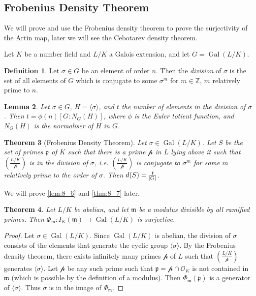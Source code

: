 \documentclass[11pt]{article}
\theoremstyle{definition}
\newtheorem{definition}{Definition}[section]
\theoremstyle{plain}
\newtheorem{theorem}[definition]{Theorem}
\newtheorem{lemma}[definition]{Lemma}
\theoremstyle{remark}
\DeclareMathOperator{\Gal}{Gal}
\newcommand{\ZZ}{\mathbb{Z}}
\newcommand{\cO}{\mathcal{O}}
\newcommand{\cp}{\mathcal{p}}
\newcommand{\fp}{\mathfrak{p}}
\newcommand{\fm}{\mathfrak{m}}
\newcommand{\leg}[2]{\left(\frac{#1}{#2}\right)}
\begin{document}
\subsection{Frobenius Density Theorem}

We will prove and use the Frobenius density theorem to prove the surjectivity of the Artin map, later we will see the Cebotarev density theorem.

Let $K$ be a number field and $L/K$ a Galois extension, and let $G = \Gal(L/K)$.

\begin{definition}\label{def:8_5}
    Let $\sigma \in G$ be an element of order $n$. Then the \emph{division} of $\sigma$ is the set of all elements of $G$ which is conjugate to some $\sigma^m$ for $m \in \ZZ$, $m$ relatively prime to $n$.
\end{definition}

\begin{lemma}\label{lem:8_6}
    Let $\sigma \in G$, $H = \langle \sigma \rangle$, and $t$ the number of elements in the division of $\sigma$. Then $t = \phi(n) [G : N_G(H)]$, where $\phi$ is the Euler totient function, and $N_G(H)$ is the normaliser of $H$ in $G$.
\end{lemma}

\begin{theorem}[Frobenius Density Theorem]\label{thm:8_7}
    Let $\sigma \in \Gal(L/K)$. Let $S$ be the set of primes $\fp$ of $K$ such that there is a prime $\cp$ in $L$ lying above it such that $\leg{L/K}{\cp}$ is in the division of $\sigma$, i.e. $\leg{L/K}{\cp}$ is conjugate to $\sigma^m$ for some $m$ relatively prime to the order of $\sigma$. Then $d(S) = \frac{t}{\abs{G}}$.
\end{theorem}

\noindent We will prove \autoref{lem:8_6} and \autoref{thm:8_7} later.

\begin{theorem}\label{thm:8_8}
    Let $L/K$ be abelian, and let $\fm$ be a modulus divisible by all ramified primes. Then $\Phi_\fm : I_K(\fm) \to \Gal(L/K)$ is surjective.
\end{theorem}
\begin{proof}
    Let $\sigma \in \Gal(L/K)$. Since $\Gal(L/K)$ is abelian, the division of $\sigma$ consists of the elements that generate the cyclic group $\langle \sigma \rangle$. By the Frobenius density theorem, there exists infinitely many primes $\cp$ of $L$ such that $\leg{L/K}{\cp}$ generates $\langle \sigma \rangle$. Let $\cp$ be any such prime such that $\fp = \cp \cap \cO_K$ is not contained in $\fm$ (which is possible by the definition of a modulus). Then $\Phi_\fm(\fp)$ is a generator of $\langle \sigma \rangle$. Thus $\sigma$ is in the image of $\Phi_\fm$.
\end{proof}
\end{document}
